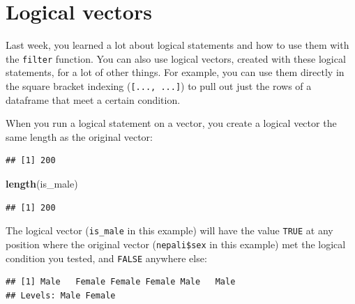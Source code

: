 \documentclass[]{book}
\makeatletter
\newenvironment{Shaded}{\begin{snugshade}}{\end{snugshade}}
\newcommand{\KeywordTok}[1]{\textcolor[rgb]{0.13,0.29,0.53}{\textbf{#1}}}
\newcommand{\StringTok}[1]{\textcolor[rgb]{0.31,0.60,0.02}{#1}}
\newcommand{\OperatorTok}[1]{\textcolor[rgb]{0.81,0.36,0.00}{\textbf{#1}}}
\newcommand{\NormalTok}[1]{#1}
\newenvironment{kframe}{%
\medskip{}
\setlength{\fboxsep}{.8em}
 \def\at@end@of@kframe{}%
 \ifinner\ifhmode%
  \def\at@end@of@kframe{\end{minipage}}%
  \begin{minipage}{\columnwidth}%
 \fi\fi%
 \def\FrameCommand##1{\hskip\@totalleftmargin \hskip-\fboxsep
 \colorbox{shadecolor}{##1}\hskip-\fboxsep
     \hskip-\linewidth \hskip-\@totalleftmargin \hskip\columnwidth}%
 \MakeFramed {\advance\hsize-\width
   \@totalleftmargin\z@ \linewidth\hsize
   \@setminipage}}%
 {\par\unskip\endMakeFramed%
 \at@end@of@kframe}
\renewenvironment{Shaded}{\begin{kframe}}{\end{kframe}}
\theoremstyle{definition}
\theoremstyle{definition}
\theoremstyle{definition}
\theoremstyle{remark}
\makeatother
\begin{document}
\section{Logical vectors}\label{logical-vectors}

Last week, you learned a lot about logical statements and how to use
them with the \texttt{filter} function. You can also use logical
vectors, created with these logical statements, for a lot of other
things. For example, you can use them directly in the square bracket
indexing (\texttt{{[}...,\ ...{]}}) to pull out just the rows of a
dataframe that meet a certain condition.

When you run a logical statement on a vector, you create a logical
vector the same length as the original vector:

\begin{Shaded}
\end{Shaded}

\begin{verbatim}
## [1] 200
\end{verbatim}

\begin{Shaded}
\begin{Highlighting}[]
\KeywordTok{length}\NormalTok{(is_male)}
\end{Highlighting}
\end{Shaded}

\begin{verbatim}
## [1] 200
\end{verbatim}

The logical vector (\texttt{is\_male} in this example) will have the
value \texttt{TRUE} at any position where the original vector
(\texttt{nepali\$sex} in this example) met the logical condition you
tested, and \texttt{FALSE} anywhere else:

\begin{Shaded}
\end{Shaded}

\begin{verbatim}
## [1] Male   Female Female Female Male   Male  
## Levels: Male Female
\end{verbatim}
\end{document}
